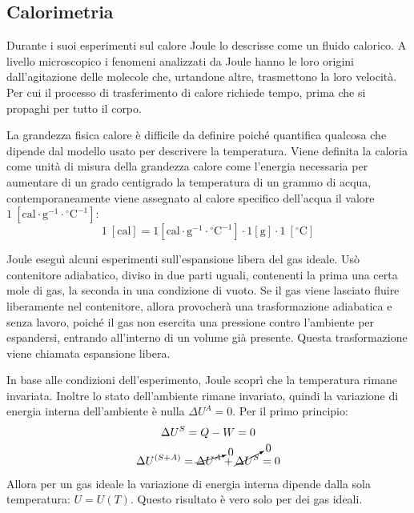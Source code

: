 \documentclass{article}
\numberwithin{equation}{subsection}
\begin{document}
\subsection{Calorimetria}
Durante i suoi esperimenti sul calore Joule lo descrisse come 
un fluido calorico. A livello microscopico i fenomeni 
analizzati da Joule hanno le loro origini dall'agitazione 
delle molecole che, urtandone altre, trasmettono la loro 
velocità. Per cui il processo di trasferimento di calore richiede tempo, prima che si propaghi per tutto il corpo. 



La grandezza fisica calore è difficile da 
definire poiché quantifica qualcosa che dipende dal modello 
usato per descrivere la temperatura. Viene definita la 
caloria come unità di misura della grandezza calore come 
l'energia necessaria per aumentare di un grado centigrado 
la temperatura 
di un grammo di acqua, contemporaneamente viene assegnato al 
calore specifico dell'acqua il valore $1\:[\mathrm{cal}\cdot\mathrm{g}^{-1}\cdot\mathrm{^\circ C}^{-1}]$:
\begin{equation}
    1\:[\mathrm{cal}]=1\left[\mathrm{cal}\cdot\mathrm{g}^{-1}\cdot\mathrm{^\circ C}^{-1}\right]\cdot 1\left[\mathrm{g}\right]\cdot1\:\left[\mathrm{^\circ C}\right]
\end{equation}



Joule eseguì alcuni esperimenti sull'espansione libera del gas ideale. Usò contenitore adiabatico, diviso in due parti uguali, contenenti la prima una certa mole di gas, la seconda 
in una condizione di vuoto. Se il gas viene lasciato fluire liberamente nel contenitore, allora provocherà una trasformazione adiabatica 
e senza lavoro, poiché il gas non esercita una pressione contro l'ambiente per espandersi, entrando all'interno di un volume già presente. Questa trasformazione viene chiamata 
espansione libera. 

In base alle condizioni dell'esperimento, Joule scoprì che la temperatura rimane invariata. Inoltre
lo stato dell'ambiente rimane invariato, quindi la variazione 
di energia interna dell'ambiente è nulla $\Delta U^A=0$. Per 
il primo principio: 
\begin{gather*}
    \Delta U^S=Q-W=0\\
    \Delta U^{(S+A)}=\cancelto{0}{\Delta U^A}+\cancelto{0}{\Delta U^S}=0
\end{gather*}
Allora per un gas ideale la variazione di energia 
interna dipende dalla sola temperatura: $U=U(T)$. Questo risultato è vero solo per dei gas ideali. 
\end{document}
